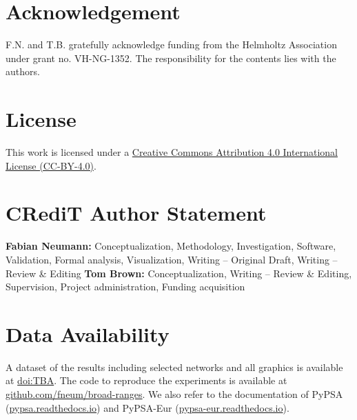 \documentclass[1p,11pt]{elsarticle}
\begin{document}


\section*{Acknowledgement}

F.N. and T.B. gratefully acknowledge funding from the Helmholtz Association
under grant no. VH-NG-1352. The responsibility for the contents lies with the
authors.

\section*{License}

This work is licensed under a \href{http://creativecommons.org/licenses/by/4.0/}{Creative Commons Attribution 4.0
International License (CC-BY-4.0)}.

\section*{CRediT Author Statement}

\textbf{Fabian Neumann:} Conceptualization, Methodology, Investigation, Software, Validation, Formal analysis, Visualization, Writing -- Original Draft, Writing -- Review \& Editing
\textbf{Tom Brown:} Conceptualization, Writing -- Review \& Editing, Supervision, Project administration, Funding acquisition

\section*{Data Availability}

A dataset of the results including selected networks and all graphics is available at \href{TBA}{doi:TBA}.
The code to reproduce the experiments is available at \href{https://github.com/fneum/broad-ranges}{github.com/fneum/broad-ranges}.
We also refer to the documentation of PyPSA (\href{https://pypsa.readthedocs.io}{pypsa.readthedocs.io}) and
PyPSA-Eur (\href{https://pypsa-eur.readthedocs.io}{pypsa-eur.readthedocs.io}).

\renewcommand{\ttdefault}{\sfdefault}


\newpage
\tableofcontents

% 	
\end{document}
